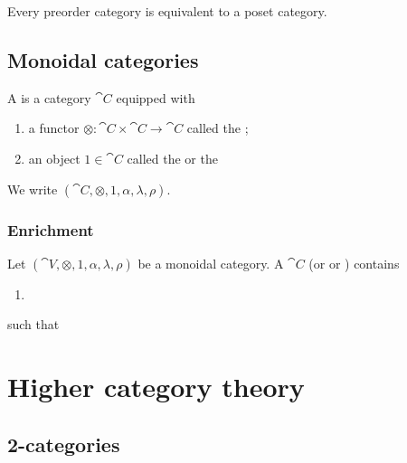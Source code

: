 \begin{lemma}
Every preorder category is equivalent to a poset category.
\end{lemma}



\section{Monoidal categories}
\begin{definition}
A  is a category $\cat{C}$ equipped with
\begin{enumerate}
\item a functor $\otimes: \cat{C}\times\cat{C} \to \cat{C}$ called the ;
\item an object $1\in \cat{C}$ called the  or the 
\end{enumerate}
We write $(\cat{C}, \otimes, 1, \alpha, \lambda, \rho)$.
\end{definition}

\subsection{Enrichment}
\begin{definition}
Let $(\cat{V}, \otimes, 1, \alpha, \lambda, \rho)$ be a monoidal category. A  $\cat{C}$ (or  or ) contains
\begin{enumerate}
\item 
\end{enumerate}
such that
\end{definition}


\chapter{Higher category theory}
\section{2-categories}
